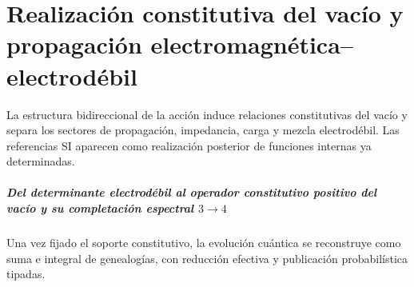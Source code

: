 \chapter{Realización constitutiva del vacío y propagación electromagnética–electrodébil}
\label{chap:parte-iv-52}

La estructura bidireccional de la acción induce relaciones constitutivas del vacío y separa los sectores de propagación, impedancia, carga y mezcla electrodébil. Las referencias SI aparecen como realización posterior de funciones internas ya determinadas.





\paragraph{Del determinante electrodébil al operador constitutivo positivo del vacío y su completación espectral \(3\to4\)} Una vez fijado el soporte constitutivo, la evolución cuántica se reconstruye como suma e integral de genealogías, con reducción efectiva y publicación probabilística tipadas.
